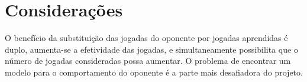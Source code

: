 \section{Considerações}

O benefício da substituição das jogadas do oponente por jogadas aprendidas é
duplo, aumenta-se a efetividade das jogadas, e simultaneamente possibilita que o
número de jogadas consideradas possa aumentar. O problema de encontrar um modelo
para o comportamento do oponente é a parte mais desafiadora do projeto.

